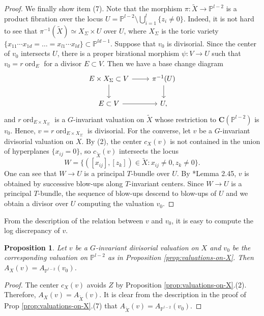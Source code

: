 \documentclass[letterpaper,11pt]{amsart}
\theoremstyle{plain}
\newtheorem{prop}[theo]{Proposition}
\theoremstyle{definition}
\theoremstyle{remark}
\newcommand{\PP}{\mathbb{P}}
\newcommand{\CC}{\mathbf{C}}
\DeclareMathOperator{\ord}{ord}
\begin{document}
\begin{proof}
        We finally show item (7). Note that the morphism $\pi \colon \widetilde{X} \to \PP^{l-2}$ is a product fibration over the locus $U = \PP^{l-2} \setminus \bigcup_{i=1}^{l} \{ z_{i} \neq 0\}$. Indeed, it is not hard to see that $\pi^{-1}(\widetilde{X}) \simeq X_{\Sigma} \times U$ over $U$, where $X_{\Sigma}$ is the toric variety $\{ x_{11}\cdots x_{1d} = \ldots = x_{l1}  \cdots x_{ld}\} \subset \PP^{ld-1}$. Suppose that $v_0$ is divisorial. Since the center of $v_{0}$ intersects $U$, there is a proper birational morphism $\psi \colon V \to U$ such that $v_{0} = r \ord_{E}$ for a divisor $E \subset V$. Then we have a base change diagram
        $$ \begin{tikzcd}
            E \times X_{\Sigma} \subset V \ar[r] \ar[d] & \pi^{-1}(U) \ar[d] \\ E \subset V \ar[r] & U,
        \end{tikzcd}$$
        and $r \ord_{E \times X_{\Sigma}}$ is a $G$-invariant valuation on $\widetilde{X}$ whose restriction to $\CC(\PP^{l-2})$ is $v_{0}$. Hence, $v = r \ord_{E \times X_{\Sigma}}$ is divisorial.
        For the converse, let $v$ be a $G$-invariant divisorial valuation on $X$. By (2), the center $c_{X}(v)$ is not contained in the union of hyperplanes $\{ x_{ij} = 0\}$, so $c_{\widetilde{X}}(v)$ intersects the locus
        $$ W = \{ ([x_{ij}], [z_{k}]) \in \widetilde{X} : x_{ij} \neq 0, z_{k} \neq 0\}.$$
        One can see that $W \to U$ is a principal $T$-bundle over $U$. By \cite{Kollar-Mori}*{Lemma 2.45}, $v$ is obtained by successive blow-ups along $T$-invariant centers. Since $W \to U$ is a principal $T$-bundle, the sequence of blow-ups descend to blow-ups of $U$ and we obtain a divisor over $U$ computing the valuation $v_{0}$.
    \end{proof}

    From the description of the relation between $v$ and $v_{0}$, it is easy to compute the log discrepancy of $v$.

    \begin{prop} \label{prop:log-discrepancy}
        Let $v$ be a $G$-invariant divisorial valuation on $X$ and $v_{0}$ be the corresponding valuation on $\PP^{l-2}$ as in Proposition \ref{prop:valuations-on-X}. Then $A_{X}(v) = A_{\PP^{l-2}}(v_{0})$.
    \end{prop}
    \begin{proof}
        The center $c_{X}(v)$ avoids $Z$ by Proposition \ref{prop:valuations-on-X}.(2). Therefore, $A_{X}(v) = A_{\widetilde{X}}(v)$. It is clear from the description in the proof of Prop \ref{prop:valuations-on-X}.(7) that $A_{\widetilde{X}}(v) = A_{\PP^{l-2}}(v_{0})$.
    \end{proof}
\end{document}
